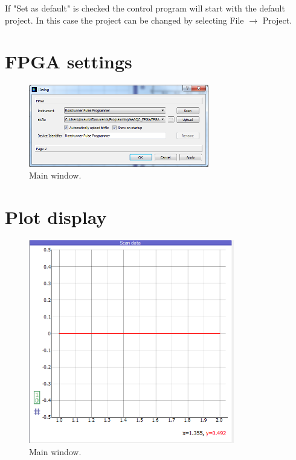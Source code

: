\documentclass{scrartcl}
\begin{document}
If "Set as default" is checked the control program will start with the default project. In this case the project can be changed by selecting File $\rightarrow$ Project.

\section{FPGA settings}
\begin{figure}[htbp]
\begin{center}
\includegraphics[width=0.7\textwidth]{FPGASettings}
\end{center}
\caption{\label{FPGASettings} Main window.}
\end{figure}

\section{Plot display}
\begin{figure}[htbp]
\begin{center}
\includegraphics[width=0.8\textwidth]{ScanData}
\end{center}
\caption{\label{ScanData} Main window.}
\end{figure}
\end{document}
